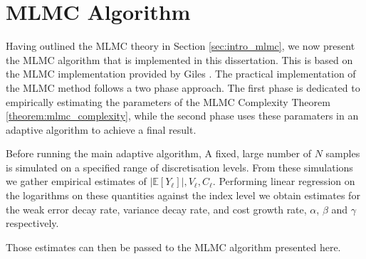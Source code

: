 \section{MLMC Algorithm}\label{sec:mlmc_algorithm}

Having outlined the MLMC theory in Section \ref{sec:intro_mlmc}, we now present 
the MLMC algorithm that is implemented in this dissertation. This is 
based on the MLMC implementation provided by Giles \cite{giles2015multilevel}.
The practical implementation of the MLMC method follows a two phase approach.
The first phase is dedicated to empirically estimating the parameters 
of the MLMC Complexity Theorem \ref{theorem:mlmc_complexity}, while the
second phase uses these paramaters in an adaptive algorithm 
to achieve a final result.

Before running the main adaptive algorithm, A fixed, large number of $N$ 
samples is simulated on a specified range of discretisation levels. From 
these simulations we gather empirical estimates of $|\mathbb{E}[Y_\ell]|, 
V_\ell, C_\ell$. Performing linear regression on the logarithms on these
quantities against the index level we obtain estimates for the weak error 
decay rate, variance decay rate, and cost growth rate, $\alpha$, $\beta$ and $\gamma$ 
respectively. 

Those estimates can then be passed to the MLMC algorithm presented here.

